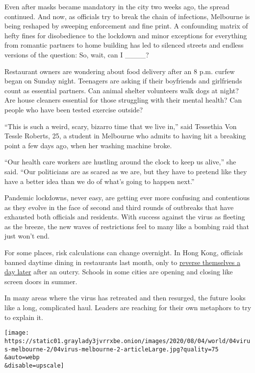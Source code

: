 Even after masks became mandatory in the city two weeks ago, the spread
continued. And now, as officials try to break the chain of infections,
Melbourne is being reshaped by sweeping enforcement and fine print. A
confounding matrix of hefty fines for disobedience to the lockdown and
minor exceptions for everything from romantic partners to home building
has led to silenced streets and endless versions of the question: So,
wait, can I \_\_\_\_?

Restaurant owners are wondering about food delivery after an 8 p.m.
curfew began on Sunday night. Teenagers are asking if their boyfriends
and girlfriends count as essential partners. Can animal shelter
volunteers walk dogs at night? Are house cleaners essential for those
struggling with their mental health? Can people who have been tested
exercise outside?

``This is such a weird, scary, bizarro time that we live in,'' said
Tessethia Von Tessle Roberts, 25, a student in Melbourne who admits to
having hit a breaking point a few days ago, when her washing machine
broke.

``Our health care workers are hustling around the clock to keep us
alive,'' she said. ``Our politicians are as scared as we are, but they
have to pretend like they have a better idea than we do of what's going
to happen next.''

Pandemic lockdowns, never easy, are getting ever more confusing and
contentious as they evolve in the face of second and third rounds of
outbreaks that have exhausted both officials and residents. With success
against the virus as fleeting as the breeze, the new waves of
restrictions feel to many like a bombing raid that just won't end.

For some places, risk calculations can change overnight. In Hong Kong,
officials banned daytime dining in restaurants last month, only to
\href{https://www.nytimes3xbfgragh.onion/2020/07/31/world/asia/hongkong-dining-lunch-coronavirus.html}{reverse
themselves a day later} after an outcry. Schools in some cities are
opening and closing like screen doors in summer.

In many areas where the virus has retreated and then resurged, the
future looks like a long, complicated haul. Leaders are reaching for
their own metaphors to try to explain it.

\texttt{[image: https://static01.graylady3jvrrxbe.onion/images/2020/08/04/world/04virus-melbourne-2/04virus-melbourne-2-articleLarge.jpg?quality=75\\\&auto=webp\\\&disable=upscale]}

